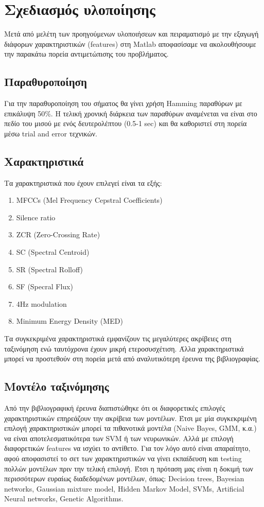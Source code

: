 \section{Σχεδιασμός υλοποίησης}

Μετά από μελέτη των προηγούμενων υλοποιήσεων και πειραματισμό με την εξαγωγή
διάφορων χαρακτηριστικών (features) στη Matlab αποφασίσαμε να ακολουθήσουμε την
παρακάτω πορεία αντιμετώπισης του προβλήματος.

\subsection{Παραθυροποίηση}

Για την παραθυροποίηση του σήματος θα γίνει χρήση Hamming παραθύρων με επικάλυψη
50\%. Η τελική χρονική διάρκεια των παραθύρων αναμένεται να είναι στο πεδίο του
μισού με ενός δευτερολέπτου (0.5-1 sec) και θα καθοριστεί στη πορεία μέσω trial
and error τεχνικών.

\subsection{Χαρακτηριστικά}

Τα χαρακτηριστικά που έχουν επιλεγεί είναι τα εξής:
\begin{enumerate}[noitemsep]
\item ΜFCCs (Mel Frequency Cepstral Coefficients)
\item Silence ratio
\item ZCR (Zero-Crossing Rate)
\item SC (Spectral Centroid)
\item SR (Spectral Rolloff)
\item SF (Specral Flux)
\item 4Hz modulation
\item Minimum Energy Density (MED)
\end{enumerate}

Τα συγκεκριμένα χαρακτηριστικά εμφανίζουν τις μεγαλύτερες ακρίβειες στη
ταξινόμηση ενώ ταυτόχρονα έχουν μικρή ετεροσυσχέτιση. Άλλα χαρακτηριστικά μπορεί
να προστεθούν στη πορεία μετά από αναλυτικότερη έρευνα της βιβλιογραφίας.

\subsection{Μοντέλο ταξινόμησης}

Από την βιβλιογραφική έρευνα διαπιστώθηκε ότι οι διαφορετικές επιλογές
χαρακτηριστικών επηρεάζουν την ακρίβεια των μοντέλων. Έτσι με μία συγκεκριμένη
επιλογή χαρακτηριστικών μπορεί τα πιθανοτικά μοντέλα (Naive Bayes, GMM, κ.α.) να
είναι αποτελεσματικότερα των SVM ή των νευρωνικών. Αλλά με επιλογή διαφορετικών
features να ισχύει το αντίθετο. Για τον λόγο αυτό είναι απαραίτητο, αφού
αποφασιστεί το σετ των χαρακτηριστικών να γίνει εκπαίδευση και testing πολλών
μοντέλων πριν την τελική επιλογή.
Έτσι η πρόταση μας είναι η δοκιμή των περισσότερων ευραίως διαδεδομένων μοντέλων,
όπως: Decision trees, Bayesian networks, Gaussian mixture model, Hidden Markov
Model, SVMs, Artificial Neural networks, Genetic Algorithms.

